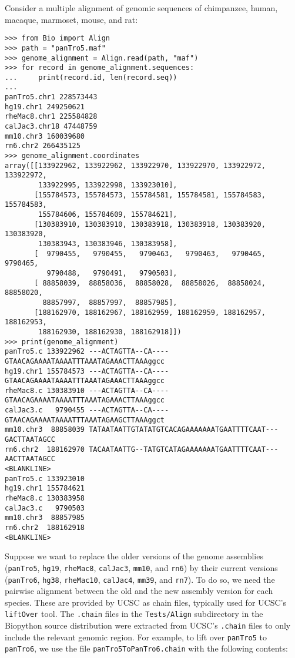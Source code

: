 Consider a multiple alignment of genomic sequences of chimpanzee, human, macaque, marmoset, mouse, and rat:
\begin{verbatim}
>>> from Bio import Align
>>> path = "panTro5.maf"
>>> genome_alignment = Align.read(path, "maf")
>>> for record in genome_alignment.sequences:
...     print(record.id, len(record.seq))
...
panTro5.chr1 228573443
hg19.chr1 249250621
rheMac8.chr1 225584828
calJac3.chr18 47448759
mm10.chr3 160039680
rn6.chr2 266435125
>>> genome_alignment.coordinates
array([[133922962, 133922962, 133922970, 133922970, 133922972, 133922972,
        133922995, 133922998, 133923010],
       [155784573, 155784573, 155784581, 155784581, 155784583, 155784583,
        155784606, 155784609, 155784621],
       [130383910, 130383910, 130383918, 130383918, 130383920, 130383920,
        130383943, 130383946, 130383958],
       [  9790455,   9790455,   9790463,   9790463,   9790465,   9790465,
          9790488,   9790491,   9790503],
       [ 88858039,  88858036,  88858028,  88858026,  88858024,  88858020,
         88857997,  88857997,  88857985],
       [188162970, 188162967, 188162959, 188162959, 188162957, 188162953,
        188162930, 188162930, 188162918]])
>>> print(genome_alignment)
panTro5.c 133922962 ---ACTAGTTA--CA----GTAACAGAAAATAAAATTTAAATAGAAACTTAAAggcc
hg19.chr1 155784573 ---ACTAGTTA--CA----GTAACAGAAAATAAAATTTAAATAGAAACTTAAAggcc
rheMac8.c 130383910 ---ACTAGTTA--CA----GTAACAGAAAATAAAATTTAAATAGAAACTTAAAggcc
calJac3.c   9790455 ---ACTAGTTA--CA----GTAACAGAAAATAAAATTTAAATAGAAGCTTAAAggct
mm10.chr3  88858039 TATAATAATTGTATATGTCACAGAAAAAAATGAATTTTCAAT---GACTTAATAGCC
rn6.chr2  188162970 TACAATAATTG--TATGTCATAGAAAAAAATGAATTTTCAAT---AACTTAATAGCC
<BLANKLINE>
panTro5.c 133923010
hg19.chr1 155784621
rheMac8.c 130383958
calJac3.c   9790503
mm10.chr3  88857985
rn6.chr2  188162918
<BLANKLINE>
\end{verbatim}
Suppose we want to replace the older versions of the genome assemblies (\verb+panTro5+, \verb+hg19+, \verb+rheMac8+, \verb+calJac3+, \verb+mm10+, and \verb+rn6+) by their current versions (\verb+panTro6+, \verb+hg38+, \verb+rheMac10+, \verb+calJac4+, \verb+mm39+, and \verb+rn7+). To do so, we need the pairwise alignment between the old and the new assembly version for each species. These are provided by UCSC as chain files, typically used for UCSC's \verb+liftOver+ tool. The \verb+.chain+ files in the \verb+Tests/Align+ subdirectory in the Biopython source distribution were extracted from UCSC's \verb+.chain+ files to only include the relevant genomic region. For example, to lift over \verb+panTro5+ to \verb+panTro6+, we use the file \verb+panTro5ToPanTro6.chain+ with the following contents:
